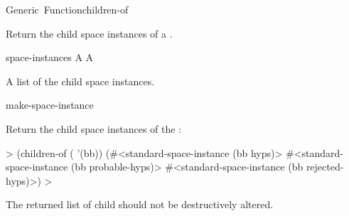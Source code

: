 \documentclass[10pt,twoside,english,pdftex]{article}
\begin{document}
\begin{functiondoc}{Generic~Function}{children-of}%
  {
    }
%

\fnsyntax

\fnpurpose Return the child space instances of a .

\fnmethods
{}%
  {\code{(} 
    \returns{} }

\fnpackage {}

\fnmodule {}

\fnargs
\begin{args}{space-instances}
 A 
 A 
\end{args}

\fnreturns A list of the child space instances.

\begin{alsos}{make-space-instance}
\also[parent-of]
\end{alsos}

\fnexample
{}%
Return the child space instances  of the  :
%
\W\supp
\begin{example}
  > (children-of ( '(bb))
  (#<standard-space-instance (bb hyps)>
   #<standard-space-instance (bb probable-hyps)>
   #<standard-space-instance (bb rejected-hyps)>)
  >
\end{example}

\fnnote The returned list of child  should not be
destructively altered.

\end{functiondoc}

\end{document}
